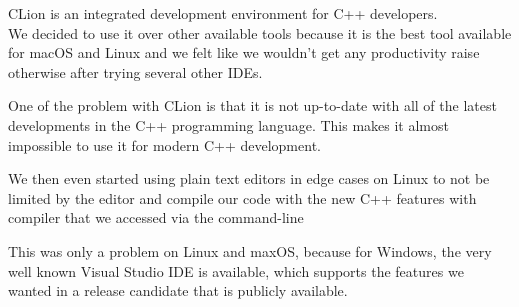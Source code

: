 CLion is an integrated development environment for C++ developers. \cite{clion} \\
We decided to use it over other available tools because it is the best tool available for macOS and Linux and we felt like we wouldn't get any productivity raise otherwise after trying several other IDEs.

One of the problem with CLion is that it is not up-to-date with all of the latest developments in the C++ programming language. This makes it almost impossible to use it for modern C++ development. 

We then even started using plain text editors in edge cases on Linux to not be limited by the editor and compile our code with the new C++ features with compiler that we accessed via the command-line
\cite{clionstatus}

This was only a problem on Linux and maxOS, because for Windows, the very well known Visual Studio IDE is available, which supports the features we wanted in a release candidate that is publicly available.
